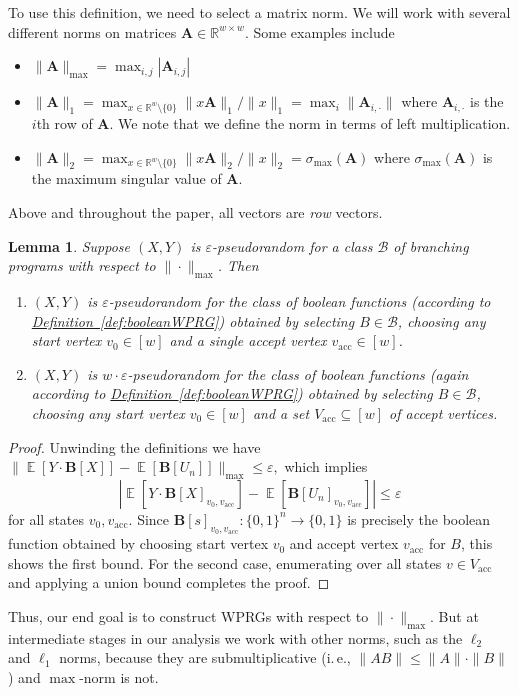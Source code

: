 \documentclass[11pt]{article}
\numberwithin{equation}{section}
\newtheorem{lemma}[theorem]{Lemma}
\theoremstyle{definition}
\theoremstyle{plain}
\newcommand{\R}{\mathbb R}
\newcommand{\ie}{i.\,e.}
\newcommand{\expref}[2]{\hyperref[#2]{#1~\ref{#2}}}
\newcommand{\eps}{\varepsilon}
\newcommand{\zo}{\{0,1\}}
\newcommand{\ra}{\rightarrow}
\newcommand{\mA}{\mathbf{A}}
\DeclareMathOperator*{\E}{\mathbb{E}}
\newcommand{\acc}{V_{\text{acc}}}
\newcommand{\vac}{v_{\text{acc}}}
\newcommand{\bp}{{\mathbf{B}}}
\begin{document}
To use this definition, we need to select a matrix norm. We will work with several different norms on matrices $\mA \in \R^{w\times w}$. Some examples include %
\begin{itemize}
    \item $\|\mA\|_{\max} = \max_{i,j}|\mA_{i,j}|$
    \item $\|\mA\|_{1} = \max_{x\in \R^w\setminus\{0\}}\|x\mA\|_1/\|x\|_1 = \max_i \|\mA_{i,\cdot}\|$ where $\mA_{i,\cdot}$ is the $i$th row of $\mA$. We note that we define the norm in terms of left multiplication.
    \item $\|\mA\|_2 = \max_{x\in \R^w\setminus \{0\}} \|x\mA \|_2/\|x\|_2=\sigma_{\max}(\mA)$ where $\sigma_{\max}(\mA)$ is the maximum singular value of $\mA$.
\end{itemize}
Above and throughout the paper, all vectors are \emph{row} vectors.
\begin{lemma}
Suppose $(X,Y)$ is $\eps$-pseudorandom for a class $\mathcal{B}$ of branching programs with respect to $\|\cdot\|_{\max}$. Then
\begin{enumerate}
    \item $(X,Y)$ is $\eps$-pseudorandom for the class of boolean functions (according to \expref{Definition}{def:booleanWPRG}) obtained by selecting $B\in \mathcal{B}$, choosing any start vertex $v_0\in[w]$ and a single accept vertex $\vac\in [w]$.
    \item $(X,Y)$ is $w\cdot \eps$-pseudorandom for the class of boolean functions (again according to \expref{Definition}{def:booleanWPRG}) obtained by selecting $B\in \mathcal{B}$, choosing any start vertex $v_0\in[w]$ and a set $\acc\subseteq[w]$ of accept vertices.
\end{enumerate}
\end{lemma}
\begin{proof}
Unwinding the definitions we have
$\| \E[Y\cdot \bp[X]] - \E[\bp[U_n]]\|_{\max}\leq \eps,$
which implies 
$$\left| \E[Y\cdot \bp[X]_{v_0,\vac}] - \E[\bp[U_n]_{v_0,\vac}]\right|\leq \eps$$
for all states $v_0,\vac$. Since $\bp[s]_{v_0,\vac}:\zo^n\ra \zo$ is precisely the boolean function obtained by choosing start vertex $v_0$ and accept vertex $\vac$ for $B$, this shows the first bound. For the second case, enumerating over all states $v\in \acc$ and applying a union bound completes the proof. 
\end{proof}
Thus, our end goal is to construct WPRGs with respect to $\|\cdot\|_{\max}$. But at intermediate stages in our analysis we work with other norms, such as the $\ell_2$ and $\ell_1$ norms, because they are submultiplicative (\ie, $\|AB\|\leq \|A\|\cdot\|B\|$) and $\max$-norm is not.
\end{document}
